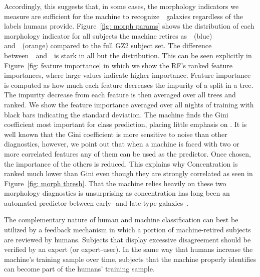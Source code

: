 Accordingly, this suggests that, in some cases, the morphology indicators we measure are sufficient for the machine to recognize~\feat~galaxies regardless of the labels humans provide. Figure~\ref{fig: morph params} shows the distribution of each morphology indicator for all subjects the machine retires as~\feat~(blue) and~\notfeat~(orange) compared to the full GZ2 subject set. The difference between~\feat~and~\notfeat~is stark in all but the  distribution. This can be seen explicitly in Figure~\ref{fig:  feature importance} in which we show the RF's ranked feature importances, where large values indicate higher importance. Feature importance is computed as how much each feature decreases the impurity of a split in a tree. The impurity decrease from each feature is then averaged over all trees and ranked. We show the feature importance averaged over all nights of training with black bars indicating the standard deviation. The machine finds the Gini coefficient most important for class prediction, placing little emphasis on . It is well known that the Gini coefficient is more sensitive to noise than other diagnostics, however, we point out that when a machine is faced with two or more correlated features any of them can be used as the predictor. Once chosen, the importance of the others is reduced. This explains why Concentration is ranked much lower than Gini even though they are strongly correlated as seen in Figure~\ref{fig: morph thresh}. That the machine relies heavily on these two morphology diagnostics is unsurprising as concentration has long been an automated predictor between early- and late-type galaxies~\citep{Abraham1994, Abraham1996, Shen2003}.


The complementary nature of human and machine classification can 
best be utilized by a feedback mechanism in which a portion of machine-retired
subjects are reviewed by humans. Subjects that display excessive disagreement
should be verified by an expert (or expert-user).  In the same way that 
humans increase the machine's training sample over time, subjects that the
machine properly identifies can become part of the humans' training sample. 



